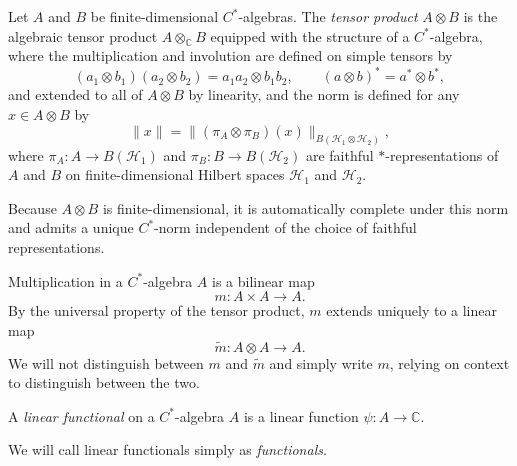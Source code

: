 \begin{definition}
    \label{def:tensor-prod}
    Let \( A \) and \( B \) be finite-dimensional \( C^* \)-algebras.
    The \emph{tensor product} \( A \otimes B \) is the algebraic
    tensor product \( A \otimes_{\mathbb{C}} B \) equipped with the
    structure of a \( C^* \)-algebra, where the multiplication and
    involution are defined on simple tensors by
    \[
        (a_1 \otimes b_1)(a_2 \otimes b_2) = a_1 a_2 \otimes b_1 b_2,
        \qquad (a \otimes b)^* = a^* \otimes b^*,
    \]
    and extended to all of \( A \otimes B \) by linearity, and the
    norm is defined for any \( x \in A \otimes B \) by
    \[
        \| x \| = \| (\pi_A \otimes \pi_B)(x)
        \|_{B(\mathcal{H}_1 \otimes \mathcal{H}_2)},
    \]
    where \( \pi_A \colon A \to B(\mathcal{H}_1) \) and \(
    \pi_B \colon B \to B(\mathcal{H}_2) \) are faithful \(
    * \)-representations of \( A \) and \( B \) on finite-dimensional
    Hilbert spaces \( \mathcal{H}_1 \) and \( \mathcal{H}_2 \).
\end{definition}

\begin{remark}
    \label{rem:finite-dimensional-tensor-prod}
    Because \(A \otimes B\) is finite-dimensional, it is
    automatically complete under this norm and admits a unique
    \(C^*\)-norm independent of the choice of faithful representations.
\end{remark}

\begin{remark}
    \label{rem:multiplication-in-cstar-algebras}
    Multiplication in a \(C^{*}\)-algebra \( A \) is a bilinear map
    \[
        m \colon A \times A \to A.
    \]
    By the universal property of the tensor product, \( m \) extends uniquely
    to a linear map
    \[
        \widetilde{m} \colon A \otimes A \to A.
    \]
    We will not distinguish between \( m \) and \( \widetilde{m} \) and
    simply write \( m \), relying on context to distinguish between the two.
\end{remark}

\begin{definition}
    \label{def:linear-functional}
    A \emph{linear functional} on a \(C^{*}\)-algebra \( A \) is a
    linear function \( \psi: A \rightarrow \mathbb{C} \).
\end{definition}

\begin{remark}
    \label{rem:functionals-nickname}
    We will call linear functionals simply as \emph{functionals}.
\end{remark}

